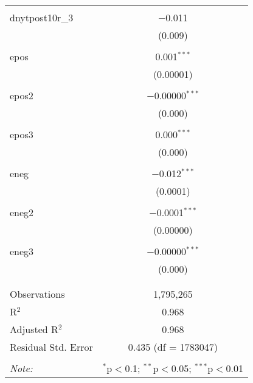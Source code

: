 \begin{table}[!htbp]
\begin{tabular}{@{\extracolsep{5pt}}lc}
  & \\ 
 dnytpost10r\_3 & $-$0.011 \\ 
  & (0.009) \\ 
  & \\ 
 epos & 0.001$^{***}$ \\ 
  & (0.00001) \\ 
  & \\ 
 epos2 & $-$0.00000$^{***}$ \\ 
  & (0.000) \\ 
  & \\ 
 epos3 & 0.000$^{***}$ \\ 
  & (0.000) \\ 
  & \\ 
 eneg & $-$0.012$^{***}$ \\ 
  & (0.0001) \\ 
  & \\ 
 eneg2 & $-$0.0001$^{***}$ \\ 
  & (0.00000) \\ 
  & \\ 
 eneg3 & $-$0.00000$^{***}$ \\ 
  & (0.000) \\ 
  & \\ 
\hline \\[-1.8ex] 
Observations & 1,795,265 \\ 
R$^{2}$ & 0.968 \\ 
Adjusted R$^{2}$ & 0.968 \\ 
Residual Std. Error & 0.435 (df = 1783047) \\ 
\hline 
\hline \\[-1.8ex] 
\textit{Note:}  & \multicolumn{1}{r}{$^{*}$p$<$0.1; $^{**}$p$<$0.05; $^{***}$p$<$0.01} \\ 
\end{tabular} 
\end{table} 

